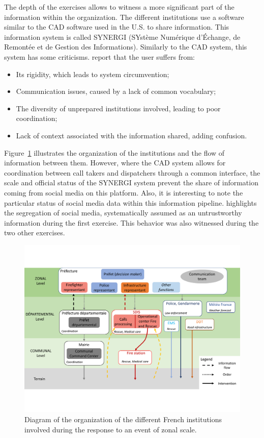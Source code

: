 The depth of the exercises allows to witness a more significant part of the information within the organization.
The different institutions use a software similar to the CAD software used in the U.S. to share information.
This information system is called SYNERGI (SYstème Numérique d’Échange, de Remontée et de Gestion des Informations).
Similarly to the CAD system, this system has some criticisms.
\textcite{linotPerspectiveComputationnelleDefi2018} report that the user suffers from:

\begin{itemize}
    \item Its rigidity, which leads to system circumvention;
    \item Communication issues, caused by a lack of common vocabulary;
    \item The diversity of unprepared institutions involved, leading to poor coordination;
    \item Lack of context associated with the information shared, adding confusion.
\end{itemize}

Figure~\ref{information:french-orga} illustrates the organization of the institutions and the flow of information between them.
However, where the CAD system allows for coordination between call takers and dispatchers
through a common interface, the scale and official status of the SYNERGI system prevent the share of information coming from social media on this platform.
Also, it is interesting to note the particular status of social media data within this information pipeline.
\textcite{castagninoWhatCanWe2019} highlights the segregation of social media, systematically assumed as an untrustworthy information during the first exercise.
This behavior was also witnessed during the two other exercises.

\begin{figure}[htb]
    \centering
    \includegraphics[width=\textwidth]{figures/chap-3/french-orga.pdf}
    \caption{Diagram of the organization of the different French institutions involved during the response to an event of zonal scale.}
    \label{information:french-orga}
\end{figure}

